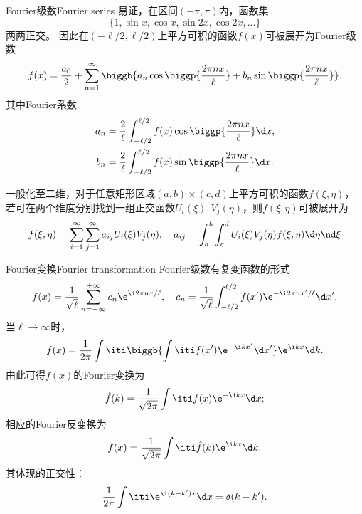 \begin{example}{Fourier级数}{Fourier series}
    易证，在区间$(-\pi,\pi)$内，函数集
    \[
        \{1,\sin x,\cos x,\sin 2x,\cos 2x,\ldots\}
    \]
    两两正交。
    因此在$(-\ell/2,\ell/2)$上平方可积的函数$f(x)$可被展开为Fourier级数
    \begin{equation}
        f(x)=\frac{a_0}2+\sum_{n=1}^\infty\biggb{a_n\cos\biggp{\frac{2\pi nx}{\ell}}+b_n\sin\biggp{\frac{2\pi nx}{\ell}}}.
    \end{equation}
    其中Fourier系数
    \begin{align*}
        a_n&=\frac2\ell\int_{-\ell/2}^{\ell/2}f(x)\cos\biggp{\frac{2\pi nx}{\ell}}\d x,\\
        b_n&=\frac2\ell\int_{-\ell/2}^{\ell/2}f(x)\sin\biggp{\frac{2\pi nx}{\ell}}\d x.
    \end{align*}
\end{example}
一般化至二维，对于任意矩形区域$(a,b)\times(c,d)$上平方可积的函数$f(\xi,\eta)$，若可在两个维度分别找到一组正交函数$U_i(\xi),V_j(\eta)$，则$f(\xi,\eta)$可被展开为
\[
    f(\xi,\eta)=\sum_{i=1}^\infty\sum_{j=1}^\infty a_{ij}U_i(\xi)V_j(\eta),
    \quad
    a_{ij}=\int_a^b\int_c^dU_i(\xi)V_j(\eta)f(\xi,\eta)\d\eta\nd\xi
\]
\begin{example}{Fourier变换}{Fourier transformation}
    Fourier级数有复变函数的形式
    \[
        f(x)=\frac1{\sqrt\ell}\sum_{n=-\infty}^{+\infty}c_n\e^{\i2\pi nx/\ell},
        \quad
        c_n=\frac1{\sqrt\ell}\int_{-\ell/2}^{\ell/2}f(x')\e^{-\i2\pi nx'/\ell}\d x'.
    \]
    当$\ell\to\infty$时，
    \[
        f(x)=\frac1{2\pi}\int\iti\biggb{\int\iti f(x')\e^{-\i kx'}\d x'}\e^{\i kx}\d k.
    \]
    由此可得$f(x)$的Fourier变换为
    \begin{equation}
        \hat f(k)=\frac1{\sqrt{2\pi}}\int\iti f(x)\e^{-\i kx}\d x;
    \end{equation}
    相应的Fourier反变换为
    \begin{equation}
        f(x)=\frac1{\sqrt{2\pi}}\int\iti\hat f(k)\e^{\i kx}\d k.
    \end{equation}
    其体现的正交性：
    \[
        \frac1{2\pi}\int\iti\e^{\i(k-k')x}\d x=\delta(k-k').
    \]
\end{example}

